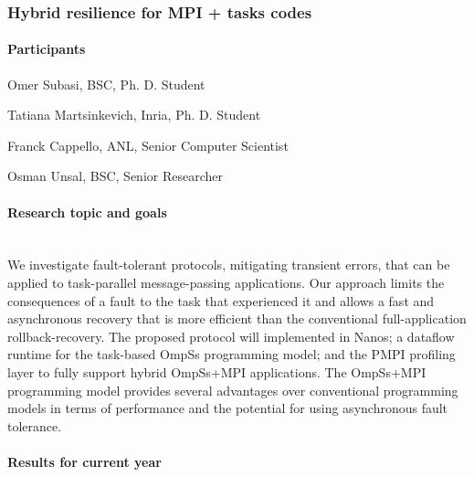 
\subsubsection{Hybrid resilience for MPI + tasks codes}
\label{Cappello-MPI-Tasks-Resilience} %

\begin{refsection}

\paragraph{Participants}

\begin{itemize*}
 \item Omer Subasi, BSC, Ph. D. Student 
 \item Tatiana Martsinkevich, Inria, Ph. D. Student 
 \item Franck Cappello, ANL, Senior Computer Scientist
 \item Osman Unsal, BSC, Senior Researcher 
 \end{itemize*}

\paragraph{Research topic and goals}~\\

We investigate fault-tolerant protocols, mitigating transient errors, that can be applied to task-parallel message-passing applications. 
Our approach limits the consequences of a fault to the task that experienced it and allows a fast and asynchronous recovery that is more efficient than the
conventional full-application rollback-recovery. The proposed protocol will implemented in Nanos; a dataflow runtime for the task-based OmpSs programming model; and the PMPI profiling layer to fully support hybrid OmpSs+MPI applications.
The OmpSs+MPI programming model provides several advantages over conventional programming models in terms of performance and the potential for using asynchronous fault tolerance. 

\paragraph{Results for current year}~\\


\end{refsection}
